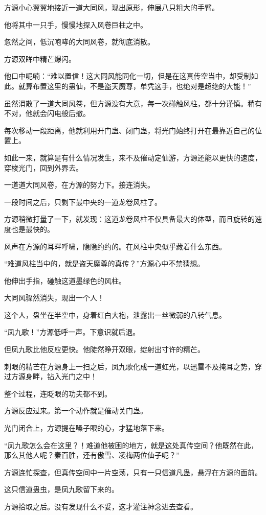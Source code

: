 \begin{this_body}
方源小心翼翼地接近一道大同风，现出原形，伸展八只粗大的手臂。

他将其中一只手，慢慢地探入风卷巨柱之中。

忽然之间，低沉咆哮的大同风卷，就彻底消散。

方源双眸中精芒爆闪。

他口中呢喃：“难以置信！这大同风能同化一切，但是在这真传空当中，却受制如此。就算布置这里的蛊仙，不是盗天魔尊，单凭这手，也绝对是超绝的大能！”

虽然消散了一道大同风卷，但方源没有大意，每一次碰触风柱，都十分谨慎。稍有不对，他就会闪电般后撤。

每次移动一段距离，他就利用开门蛊、闭门蛊，将光门始终打开在最靠近自己的位置上。

如此一来，就算是有什么情况发生，来不及催动定仙游，方源还能以更快的速度，穿梭光门，回到外界去。

一道道大同风卷，在方源的努力下。接连消失。

一段时间之后，只剩下最中央的一道龙卷风柱了。

方源稍微打量了一下，就发现：这道龙卷风柱不仅具备最大的体型，而且旋转的速度也是最快的。

风声在方源的耳畔呼啸，隐隐约约的。在风柱中央似乎藏着什么东西。

“难道风柱当中的，就是盗天魔尊的真传？”方源心中不禁猜想。

他伸出手指，碰触这道墨绿色的风柱。

大同风骤然消失，现出一个人！

这个人，盘坐在半空中，身着红白大袍，泄露出一丝微弱的八转气息。

“凤九歌！”方源低呼一声。下意识就后退。

但凤九歌比他反应更快。他陡然睁开双眼，绽射出寸许的精芒。

刺眼的精芒在方源身上一扫之后，凤九歌化成一道虹光，以迅雷不及掩耳之势，穿过方源身畔，钻入光门之中！

整个过程，连眨眼的功夫都不到。

方源反应过来。第一个动作就是催动关门蛊。

光门闭合上，方源提在嗓子眼的心，才猛地落下来。

“凤九歌怎么会在这里？！难道他被困的地方，就是这处真传空间？他既然在此，那么其他人呢？秦百胜，还有傲雪、凌梅两位仙子呢？”

方源连忙探查，但真传空间中一片空荡，只有一只信道凡蛊，悬浮在方源的面前。

这只信道蛊虫，是凤九歌留下来的。

方源拾取之后。没有发现什么不妥，这才灌注神念进去查看。


\end{this_body}
